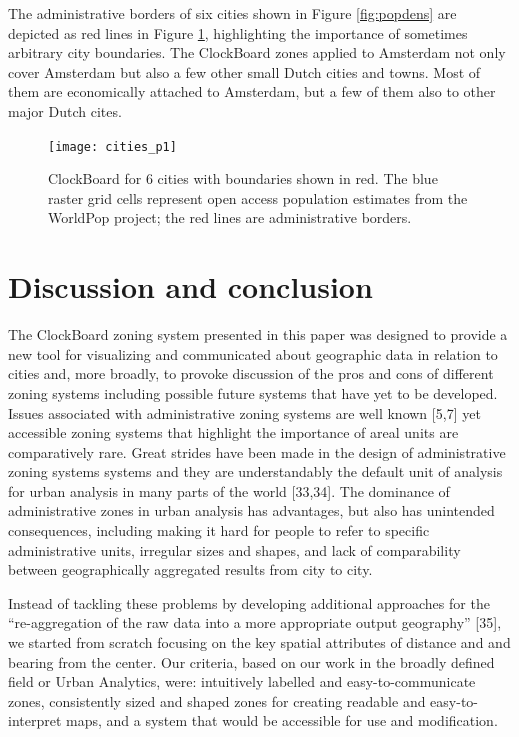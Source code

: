 \documentclass{josis}
\begin{document}
The administrative borders of six cities shown in Figure \ref{fig:popdens} are depicted as red lines in Figure \ref{fig:popdens2}, highlighting the importance of sometimes arbitrary city boundaries.
The ClockBoard zones applied to Amsterdam not only cover Amsterdam but also a few other small Dutch cities and towns. Most of them are economically attached to Amsterdam, but a few of them also to other major Dutch cites.

\begin{figure}

{\centering \texttt{[image: cities\_p1]} 

}

\caption{ClockBoard for 6 cities with boundaries shown in red. The blue raster grid cells represent open access population estimates from the WorldPop project; the red lines are administrative borders.}\label{fig:popdens2}
\end{figure}

\hypertarget{discussion}{%
\section{Discussion and conclusion}\label{discussion}}

The ClockBoard zoning system presented in this paper was designed to provide a new tool for visualizing and communicated about geographic data in relation to cities and, more broadly, to provoke discussion of the pros and cons of different zoning systems including possible future systems that have yet to be developed.
Issues associated with administrative zoning systems are well known {[}5,7{]} yet accessible zoning systems that highlight the importance of areal units are comparatively rare.
Great strides have been made in the design of administrative zoning systems systems and they are understandably the default unit of analysis for urban analysis in many parts of the world {[}33,34{]}.
The dominance of administrative zones in urban analysis has advantages, but also has unintended consequences, including making it hard for people to refer to specific administrative units, irregular sizes and shapes, and lack of comparability between geographically aggregated results from city to city.

Instead of tackling these problems by developing additional approaches for the ``re-aggregation of the raw data into a more
appropriate output geography'' {[}35{]}, we started from scratch focusing on the key spatial attributes of distance and and bearing from the center.
Our criteria, based on our work in the broadly defined field or Urban Analytics, were: intuitively labelled and easy-to-communicate zones, consistently sized and shaped zones for creating readable and easy-to-interpret maps, and a system that would be accessible for use and modification.
\end{document}

